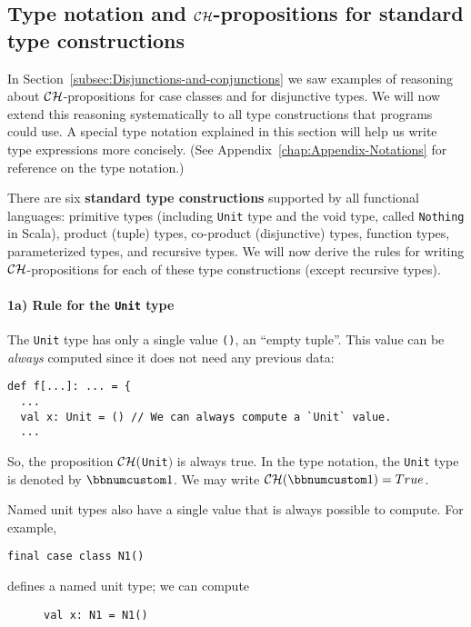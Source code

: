 \subsection{Type notation and ${\cal CH}$-propositions for standard type constructions\label{subsec:Type-notation-and-standard-type-constructions}}

In Section~\ref{subsec:Disjunctions-and-conjunctions} we saw examples
of reasoning about ${\cal CH}$-propositions for case classes and
for disjunctive types. We will now extend this reasoning systematically
to all type constructions that programs could use. A special type
notation explained in this section will help
us write type expressions more concisely. (See Appendix~\ref{chap:Appendix-Notations}
for reference on the type notation.)

There are six \textbf{standard type constructions}
supported by all functional languages: primitive types (including
\lstinline!Unit! type and the void type, called \lstinline!Nothing!
in Scala), product (tuple) types, co-product (disjunctive) types,
function types, parameterized types, and recursive types. We will
now derive the rules for writing ${\cal CH}$-propositions for each
of these type constructions (except recursive types).

\paragraph{1a) Rule for the \texttt{Unit} type}

The \lstinline!Unit! type has only a single value \lstinline!()!,
an \textsf{``}empty tuple\textsf{''}. This value can be \emph{always} computed since
it does not need any previous data:
\begin{lstlisting}
def f[...]: ... = {
  ...
  val x: Unit = () // We can always compute a `Unit` value.
  ...
\end{lstlisting}
So, the proposition ${\cal CH}($\lstinline!Unit!$)$ is always true.
In the type notation, the \lstinline!Unit! type is denoted by $\bbnum 1$.
We may write $\mathcal{CH}(\bbnum 1)=True$.

Named unit types also have a single value
that is always possible to compute. For example,
\begin{lstlisting}
final case class N1()
\end{lstlisting}
defines a named unit type; we can compute

\begin{wrapfigure}{l}{0.42\columnwidth}%
\vspace{-0.7\baselineskip}
\begin{lstlisting}
val x: N1 = N1()
\end{lstlisting}

\vspace{-0.9\baselineskip}
\end{wrapfigure}%


